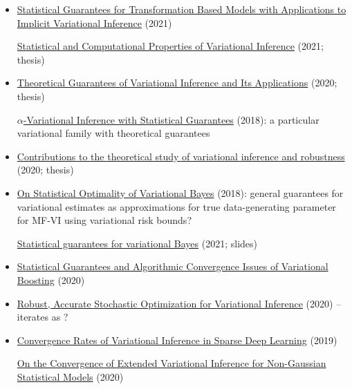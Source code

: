 \documentclass[10pt]{article}
\begin{document}
\begin{itemize}
\item
\href{https://proceedings.mlr.press/v130/plummer21a/plummer21a.pdf}{Statistical Guarantees for Transformation Based Models with Applications to Implicit Variational Inference} (2021)

\href{https://oaktrust.library.tamu.edu/bitstream/handle/1969.1/195122/PLUMMER-DISSERTATION-2021.pdf?sequence=1&isAllowed=y}{Statistical and Computational Properties of Variational Inference} (2021; thesis)
\item
\href{https://knowledge.uchicago.edu/record/2221?ln=en}{Theoretical Guarantees of Variational Inference and Its Applications} (2020; thesis)

\href{https://arxiv.org/pdf/1710.03266.pdf}{$\alpha$-Variational Inference with Statistical Guarantees} (2018): a particular variational family with theoretical guarantees
\item
\href{https://tel.archives-ouvertes.fr/tel-02893465/document}{Contributions to the theoretical study of variational inference and robustness} (2020; thesis)
\item
\href{https://par.nsf.gov/servlets/purl/10180931}{On Statistical Optimality of Variational Bayes} (2018): general guarantees for variational estimates as approximations for true data-generating parameter for MF-VI using variational risk bounds?

\href{https://math.unm.edu/~skripka/workshop_high_dim/Anirban_Talks.pdf}{Statistical guarantees for variational Bayes} (2021; slides)
\item
\href{https://arxiv.org/pdf/2010.09540.pdf}{Statistical Guarantees and Algorithmic Convergence Issues of Variational Boosting} (2020)
\item
\href{https://proceedings.neurips.cc/paper/2020/file/7cac11e2f46ed46c339ec3d569853759-Paper.pdf}{Robust, Accurate Stochastic Optimization for Variational Inference} (2020) -- iterates as \mcmc?
\item
\href{https://arxiv.org/pdf/1908.04847.pdf}{Convergence Rates of Variational Inference in Sparse Deep Learning} (2019)

\href{https://arxiv.org/pdf/1902.05068.pdf}{On the Convergence of Extended Variational Inference for Non-Gaussian Statistical Models} (2020)

\end{itemize}


\newpage



\end{document}
